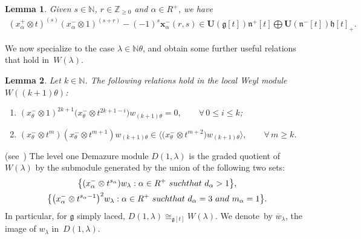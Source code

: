 \documentclass[10pt,a4paper]{amsart}
\newtheorem{lemma}{Lemma}
\begin{document}
\begin{lemma}\label{garland}
Given $s\in\mathbb{N}$, $r\in\mathbb{Z}_{\geq0}$ and $\alpha\in R^{+}$, we have
\begin{gather*}
(x^{+}_{\alpha} \otimes t)^{(s)}(x^{-}_{\alpha} \otimes
1)^{(s+r)}-(-1)^s\mathbf{x}^{-}_{\alpha}(r,s)\in\mathbf{U}(\mathfrak{g}[t])\mathfrak{n}^{+}[t]\bigoplus
\mathbf{U}(\mathfrak{n}^{-}[t])\mathfrak{h}[t]_{+}.
\end{gather*}
\end{lemma}

We now specialize to the case $\lambda\in \mathbb{N}\theta$, and obtain some further useful relations that hold in~$W(\lambda)$.
\begin{lemma}
\label{g}
Let $k\in\mathbb{N}$.
The following relations hold in the local Weyl module $W((k+1)\theta)$:
\begin{enumerate}\itemsep=0pt
\item[$1)$] $(x^{-}_{\theta}\otimes 1)^{2k+1}\big(x^{-}_{\theta}\otimes t^{2k+1-i}\big)w_{(k+1)\theta}=0,
\qquad
\forall\,
0\leq i \leq k$;
\item[$2)$] $(x^{-}_{\theta}\otimes t^m)(x^{-}_{\theta} \otimes t^{m+1})  w_{(k+1)\theta} \in  \big\langle \big(x^{-}_{\theta}
\otimes t^{m+2}\big) w_{(k+1)\theta} \rangle,
\qquad
\forall\,
m\geq k$.
\end{enumerate}
\end{lemma}

\begin{definition}
\textup{(see~\cite[Corollary 3.5]{CV})} The level one Demazure module $D(1,\lambda)$ is the graded quotient of
$W(\lambda)$ by the submodule generated by the union of the following two sets:
\begin{gather}
\big\{(x^{-}_{\alpha} \otimes t^{s_{\alpha}})  w_{\lambda}: \alpha\in R^{+}~\textup{such that}~d_{\alpha} > 1\big\},
\label{dm1}
\\
\big\{\big(x^{-}_{\alpha} \otimes t^{s_{\alpha}-1}\big)^2  w_{\lambda}: \alpha\in R^{+}~\textup{such that}~d_\alpha =3~\textup{and}~m_\alpha=1\big\}.
\label{dm2}
\end{gather}
In particular, for $\mathfrak{g}$ simply laced, $D(1,\lambda)\cong_{\mathfrak{g}[t]} W(\lambda)$. We denote~by
$\overline{w}_\lambda$, the image of $w_\lambda$ in~$D(1,\lambda)$.
\end{definition}
\end{document}
